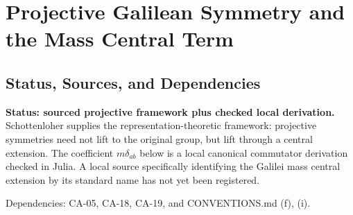 
\section{Projective Galilean Symmetry and the Mass Central Term}
\label{sec:galilean-projective-mass}

\subsection{Status, Sources, and Dependencies}

\textbf{Status: sourced projective framework plus checked local derivation.}
Schottenloher supplies the representation-theoretic framework: projective
symmetries need not lift to the original group, but lift through a central
extension.  The coefficient \(m\delta_{ab}\) below is a local canonical
commutator derivation checked in Julia.  A local source specifically identifying
the Galilei mass central extension by its standard name has not yet been
registered.

Dependencies: CA-05, CA-18, CA-19, and CONVENTIONS.md (f), (i).


